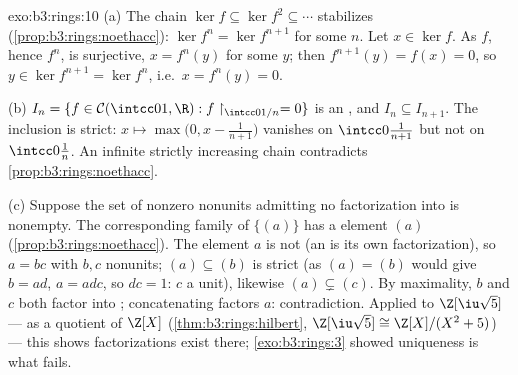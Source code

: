 \begin{solution}{exo:b3:rings:10}
(a) The chain $\ker f \subseteq \ker f^2 \subseteq \cdots$
stabilizes (\cref{prop:b3:rings:noethacc}): $\ker f^n = \ker
f^{n+1}$ for some $n$. Let $x \in \ker f$. As $f$, hence $f^n$, is
surjective, $x = f^n(y)$ for some $y$; then $f^{n+1}(y) = f(x) =
0$, so $y \in \ker f^{n+1} = \ker f^n$, i.e.\ $x = f^n(y) = 0$.

(b) $I_n = \{f \in \mathcal C(\intcc01, \R) : f\restriction_{
\intcc0{1/n}} = 0\}$ is an , and $I_n \subseteq I_{n+1}$. The
inclusion is strict: $x \mapsto \max\bigl(0, x -
\frac1{n+1}\bigr)$ vanishes on $\intcc0{\frac1{n+1}}$ but not on
$\intcc0{\frac1n}$. An infinite strictly increasing chain
contradicts \cref{prop:b3:rings:noethacc}.

(c) Suppose the set of nonzero nonunits admitting no factorization
into  is nonempty. The corresponding family of 
$\{(a)\}$ has a  element $(a)$
(\cref{prop:b3:rings:noethacc}). The element $a$ is not
 (an  is its own factorization), so $a = bc$
with $b, c$ nonunits; $(a) \subseteq (b)$ is strict (as $(a) =
(b)$ would give $b = ad$, $a = adc$, so $dc = 1$: $c$ a unit),
likewise $(a) \subsetneq (c)$. By maximality, $b$ and $c$ both
factor into ; concatenating factors $a$:
contradiction. Applied to $\Z[\iu\sqrt5]$ ---  as a
quotient of $\Z[X]$ (\cref{thm:b3:rings:hilbert}, $\Z[\iu\sqrt5]
\cong \Z[X]/(X^2+5)$) --- this shows factorizations exist there;
\cref{exo:b3:rings:3} showed uniqueness is what fails.
\end{solution}

